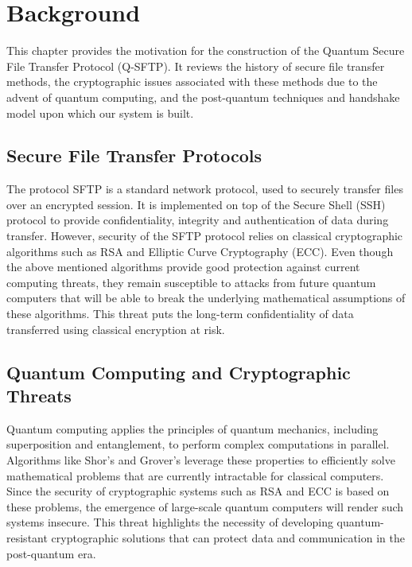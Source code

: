 \chapter{Background}
\label{chap.2}

This chapter provides the motivation for the construction of the Quantum Secure File Transfer Protocol (Q-SFTP). It reviews the history of secure file transfer methods, the cryptographic issues associated with these methods due to the advent of quantum computing, and the post-quantum techniques and handshake model upon which our system is built. 

\section{Secure File Transfer Protocols}

The protocol SFTP is a standard network protocol, used to securely transfer files over an encrypted session. It is implemented on top of the Secure Shell (SSH) protocol to provide confidentiality, integrity and authentication of data during transfer. However, security of the SFTP protocol relies on classical cryptographic algorithms such as RSA and Elliptic Curve Cryptography (ECC). Even though the above mentioned algorithms provide good protection against current computing threats, they remain susceptible to attacks from future quantum computers that will be able to break the underlying mathematical assumptions of these algorithms. This threat puts the long-term confidentiality of data transferred using classical encryption at risk. 

\section{Quantum Computing and Cryptographic Threats}

Quantum computing applies the principles of quantum mechanics, including superposition and entanglement, to perform complex computations in parallel.  Algorithms like Shor’s and Grover’s leverage these properties to efficiently solve mathematical problems that are currently intractable for classical computers.  Since the security of cryptographic systems such as RSA and ECC is based on these problems, the emergence of large-scale quantum computers will render such systems insecure.  This threat highlights the necessity of developing quantum-resistant cryptographic solutions that can protect data and communication in the post-quantum era. 

